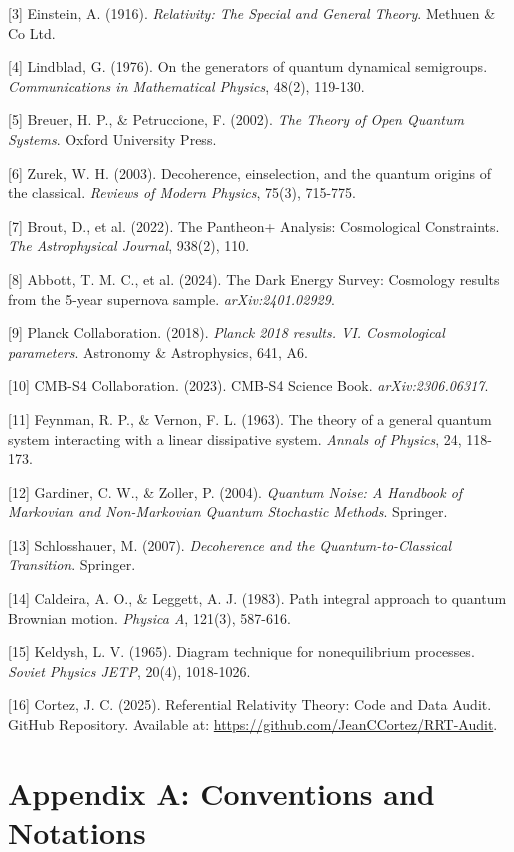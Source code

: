 \documentclass[10pt, a4paper]{article}
\begin{document}
[3] Einstein, A. (1916). \textit{Relativity: The Special and General Theory}. Methuen \& Co Ltd.

[4] Lindblad, G. (1976). On the generators of quantum dynamical semigroups. \textit{Communications in Mathematical Physics}, 48(2), 119-130.

[5] Breuer, H. P., \& Petruccione, F. (2002). \textit{The Theory of Open Quantum Systems}. Oxford University Press.

[6] Zurek, W. H. (2003). Decoherence, einselection, and the quantum origins of the classical. \textit{Reviews of Modern Physics}, 75(3), 715-775.

[7] Brout, D., et al. (2022). The Pantheon+ Analysis: Cosmological Constraints. \textit{The Astrophysical Journal}, 938(2), 110.

[8] Abbott, T. M. C., et al. (2024). The Dark Energy Survey: Cosmology results from the 5-year supernova sample. \textit{arXiv:2401.02929}.

[9] Planck Collaboration. (2018). \textit{Planck 2018 results. VI. Cosmological parameters}. Astronomy \& Astrophysics, 641, A6.

[10] CMB-S4 Collaboration. (2023). CMB-S4 Science Book. \textit{arXiv:2306.06317}.

[11] Feynman, R. P., \& Vernon, F. L. (1963). The theory of a general quantum system interacting with a linear dissipative system. \textit{Annals of Physics}, 24, 118-173.

[12] Gardiner, C. W., \& Zoller, P. (2004). \textit{Quantum Noise: A Handbook of Markovian and Non-Markovian Quantum Stochastic Methods}. Springer.

[13] Schlosshauer, M. (2007). \textit{Decoherence and the Quantum-to-Classical Transition}. Springer.

[14] Caldeira, A. O., \& Leggett, A. J. (1983). Path integral approach to quantum Brownian motion. \textit{Physica A}, 121(3), 587-616.

[15] Keldysh, L. V. (1965). Diagram technique for nonequilibrium processes. \textit{Soviet Physics JETP}, 20(4), 1018-1026.

[16] Cortez, J. C. (2025). Referential Relativity Theory: Code and Data Audit. GitHub Repository. Available at: \url{https://github.com/JeanCCortez/RRT-Audit}.

\appendix

\section{Appendix A: Conventions and Notations}
\end{document}
